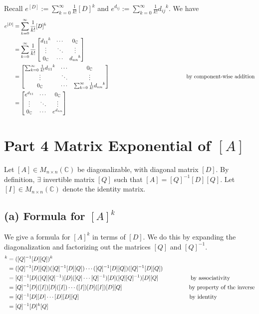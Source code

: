 \documentclass[12pt, letterpaper]{article}
\newcommand{\C}{\mathbb{C}}
\begin{document}
Recall $e^{[D]} := \sum_{k=0}^\infty \frac{1}{k!} [D]^k$ and $e^{d_{ij}} := \sum_{k=0}^\infty \frac{1}{k!} {d_{ij}}^k$. We have
\begin{align*}
	e^{[D]} &= \sum_{k=0}^\infty \frac{1}{k!} [D]^k \\
		&=
		\sum_{k=0}^\infty \frac{1}{k!} 
		 \begin{bmatrix}
			{d_{11}}^k & \cdots & 0_\C\\
			\vdots & \ddots & \vdots \\
			0_\C & \cdots & {d_{nn}}^k
		\end{bmatrix} \\		
		&=
		\begin{bmatrix}
			\sum_{k=0}^\infty \frac{1}{k!} {d_{11}}^k & \cdots & 0_\C\\
			\vdots & \ddots & \vdots \\
			0_\C & \cdots & \sum_{k=0}^\infty \frac{1}{k!} {d_{nn}}^k
		\end{bmatrix}  \hspace{13.7em} \text{by component-wise addition} \\	
		&=
		\begin{bmatrix}
			e^{d_{11}} & \cdots & 0_\C\\
			\vdots & \ddots & \vdots \\
			0_\C & \cdots & e^{d_{nn}}
		\end{bmatrix}			
\end{align*}

\section*{Part 4 \textmd{Matrix Exponential of $[A]$}}

Let $[A] \in M_{n\times n}(\C)$ be diagonalizable, with diagonal matrix $[D]$. By definition, $\exists$ invertible matrix $[Q]$ such that $[A] = [Q]^{-1}[D][Q]$. Let $[I] \in M_{n \times n}(\C)$ denote the identity matrix.

\subsection*{(a) \textmd{Formula for $[A]^k$}}

We give a formula for $[A]^k$ in terms of $[D]$. We do this by expanding the diagonalization and factorizing out the matrices $[Q]$ and $[Q]^{-1}$.
\begin{align*}
	[A]^k &= ([Q]^{-1}[D][Q])^k \\
		&= ([Q]^{-1}[D][Q])([Q]^{-1}[D][Q])\cdots([Q]^{-1}[D][Q])([Q]^{-1}[D][Q]) \\
		&= [Q]^{-1}[D]([Q][Q]^{-1})[D]([Q]\cdots[Q]^{-1})[D]([Q][Q]^{-1})[D][Q]  \hspace{5.55em} \text{by associativity}\\
		&= [Q]^{-1}[D]([I])[D]([I])\cdots([I])[D]([I])[D][Q]  \hspace{11.5em} \text{by property of the inverse}\\
		&= [Q]^{-1}[D][D]\cdots[D][D][Q]  \hspace{19.0em} \text{by identity} \\
		&= [Q]^{-1}[D]^k[Q]
\end{align*}
\end{document}
